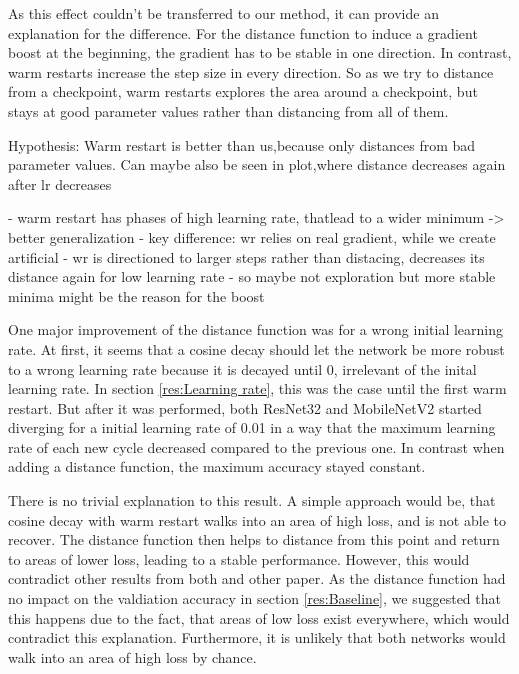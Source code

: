 As this effect couldn't be
transferred to our method, it can provide an explanation for the difference. For
the distance function to induce a gradient boost at the beginning, the gradient
has to be stable in one direction. In contrast, warm restarts increase the step
size in every direction. So as we try to distance from a checkpoint, warm
restarts explores the area around a checkpoint, but stays at good parameter
values rather than distancing from all of them.




Hypothesis: Warm restart is better than us,because only distances from bad
parameter values. Can maybe also be seen in plot,where distance decreases again after lr decreases





- warm restart has phases of high learning rate, thatlead to a wider minimum -> better generalization
- key difference: wr relies on real gradient, while we create artificial
- wr is directioned to  larger steps rather than distacing, decreases its distance again for low learning rate
- so maybe not exploration but more stable minima might be the reason for the boost

One major improvement of the distance function was for a wrong initial learning
rate. At first, it seems that a cosine decay should let the network be more
robust to a wrong learning rate because it is decayed until 0, irrelevant of the
inital learning rate. In section \ref{res:Learning rate}, this was the case
until the first warm restart. But after it was performed, both ResNet32 and
MobileNetV2 started diverging for a initial learning rate of 0.01 in a way that
the maximum learning rate of each new cycle decreased compared to the previous
one. In contrast when adding a distance function, the maximum accuracy stayed
constant.

There is no trivial explanation to this result. A simple approach would be, that
cosine decay with warm restart walks into an area of high loss, and is not able
to recover. The distance function then helps to distance from this point and
return to areas of lower loss, leading to a stable performance. However, this
would contradict other results from both and other paper. As the distance
function had no impact on the valdiation accuracy in section \ref{res:Baseline},
we suggested that this happens due to the fact, that areas of low loss exist
everywhere, which would contradict this explanation. Furthermore, it is unlikely
that both networks would walk into an area of high loss by chance.

